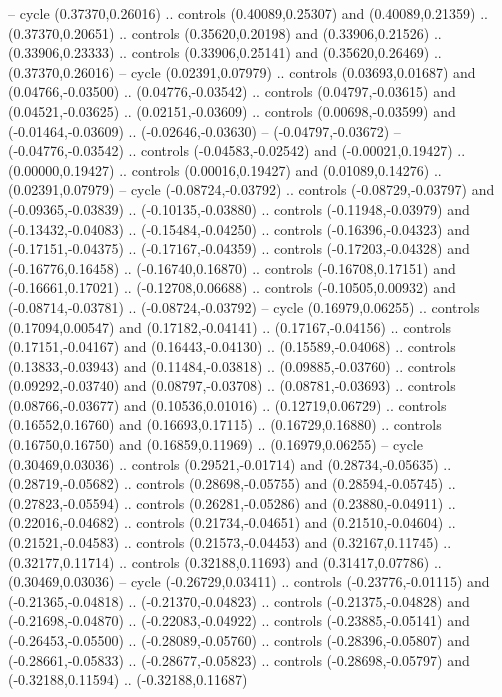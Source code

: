 {{-- cycle
(0.37370,0.26016)
.. controls (0.40089,0.25307) and (0.40089,0.21359) .. (0.37370,0.20651)
.. controls (0.35620,0.20198) and (0.33906,0.21526) .. (0.33906,0.23333)
.. controls (0.33906,0.25141) and (0.35620,0.26469) .. (0.37370,0.26016)
-- cycle
(0.02391,0.07979)
.. controls (0.03693,0.01687) and (0.04766,-0.03500) .. (0.04776,-0.03542)
.. controls (0.04797,-0.03615) and (0.04521,-0.03625) .. (0.02151,-0.03609)
.. controls (0.00698,-0.03599) and (-0.01464,-0.03609) .. (-0.02646,-0.03630)
-- (-0.04797,-0.03672)
-- (-0.04776,-0.03542)
.. controls (-0.04583,-0.02542) and (-0.00021,0.19427) .. (0.00000,0.19427)
.. controls (0.00016,0.19427) and (0.01089,0.14276) .. (0.02391,0.07979)
-- cycle
(-0.08724,-0.03792)
.. controls (-0.08729,-0.03797) and (-0.09365,-0.03839) .. (-0.10135,-0.03880)
.. controls (-0.11948,-0.03979) and (-0.13432,-0.04083) .. (-0.15484,-0.04250)
.. controls (-0.16396,-0.04323) and (-0.17151,-0.04375) .. (-0.17167,-0.04359)
.. controls (-0.17203,-0.04328) and (-0.16776,0.16458) .. (-0.16740,0.16870)
.. controls (-0.16708,0.17151) and (-0.16661,0.17021) .. (-0.12708,0.06688)
.. controls (-0.10505,0.00932) and (-0.08714,-0.03781) .. (-0.08724,-0.03792)
-- cycle
(0.16979,0.06255)
.. controls (0.17094,0.00547) and (0.17182,-0.04141) .. (0.17167,-0.04156)
.. controls (0.17151,-0.04167) and (0.16443,-0.04130) .. (0.15589,-0.04068)
.. controls (0.13833,-0.03943) and (0.11484,-0.03818) .. (0.09885,-0.03760)
.. controls (0.09292,-0.03740) and (0.08797,-0.03708) .. (0.08781,-0.03693)
.. controls (0.08766,-0.03677) and (0.10536,0.01016) .. (0.12719,0.06729)
.. controls (0.16552,0.16760) and (0.16693,0.17115) .. (0.16729,0.16880)
.. controls (0.16750,0.16750) and (0.16859,0.11969) .. (0.16979,0.06255)
-- cycle
(0.30469,0.03036)
.. controls (0.29521,-0.01714) and (0.28734,-0.05635) .. (0.28719,-0.05682)
.. controls (0.28698,-0.05755) and (0.28594,-0.05745) .. (0.27823,-0.05594)
.. controls (0.26281,-0.05286) and (0.23880,-0.04911) .. (0.22016,-0.04682)
.. controls (0.21734,-0.04651) and (0.21510,-0.04604) .. (0.21521,-0.04583)
.. controls (0.21573,-0.04453) and (0.32167,0.11745) .. (0.32177,0.11714)
.. controls (0.32188,0.11693) and (0.31417,0.07786) .. (0.30469,0.03036)
-- cycle
(-0.26729,0.03411)
.. controls (-0.23776,-0.01115) and (-0.21365,-0.04818) .. (-0.21370,-0.04823)
.. controls (-0.21375,-0.04828) and (-0.21698,-0.04870) .. (-0.22083,-0.04922)
.. controls (-0.23885,-0.05141) and (-0.26453,-0.05500) .. (-0.28089,-0.05760)
.. controls (-0.28396,-0.05807) and (-0.28661,-0.05833) .. (-0.28677,-0.05823)
.. controls (-0.28698,-0.05797) and (-0.32188,0.11594) .. (-0.32188,0.11687)
}}
